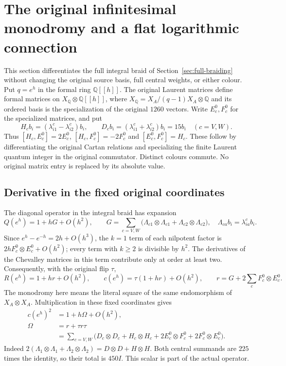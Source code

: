 \section{The original infinitesimal monodromy and a flat logarithmic connection}
\label{sec:infinitesimal-braid}
This section differentiates the full integral braid of
Section~\ref{sec:full-braiding} without changing the original source
basis, full central weights, or either colour. Put $q=e^h$ in the
formal ring $\mathbb Q[[h]]$. The original Laurent matrices define
formal matrices on $X_{\mathbb Q}\otimes\mathbb Q[[h]]$, where
$X_{\mathbb Q}=X_A/(q-1)X_A\otimes\mathbb Q$ and its ordered basis
is the specialization of the original $1260$ vectors. Write
$E_c^0,F_c^0$ for the specialized matrices, and put
\[
 H_c b_i=(\lambda^c_{i1}-\lambda^c_{i2})b_i,\qquad
 D_c b_i=(\lambda^c_{i1}+\lambda^c_{i2})b_i=15b_i
 \quad(c=V,W).
\]
Thus $[H_c,E_c^0]=2E_c^0$, $[H_c,F_c^0]=-2F_c^0$ and
$[E_c^0,F_c^0]=H_c$. These follow by differentiating the original
Cartan relations and specializing the finite Laurent quantum integer
in the original commutator. Distinct colours commute. No original
matrix entry is replaced by its absolute value.

\subsection{Derivative in the fixed original coordinates}
The diagonal operator in the integral braid has expansion
\[
 Q(e^h)=1+hG+O(h^2),\qquad
 G=\sum_{c=V,W}\bigl(\Lambda_{c1}\otimes\Lambda_{c1}
                       +\Lambda_{c2}\otimes\Lambda_{c2}\bigr),
 \quad \Lambda_{ca}b_i=\lambda^c_{ia}b_i.
\]
Since $e^h-e^{-h}=2h+O(h^3)$, the $k=1$ term of each nilpotent
factor is $2hF_c^0\otimes E_c^0+O(h^2)$; every term with $k\ge2$
is divisible by $h^2$. The derivatives of the Chevalley matrices
in this term contribute only at order at least two. Consequently,
with the original flip $\tau$,
\begin{equation}
 R(e^h)=1+hr+O(h^2),\qquad c(e^h)=\tau(1+hr)+O(h^2),\qquad
 r=G+2\sum_c F_c^0\otimes E_c^0.
 \label{eq:ib-r}
\end{equation}
The monodromy here means the literal square of the same endomorphism
of $X_A\otimes X_A$. Multiplication in these fixed coordinates gives
\begin{align}
 c(e^h)^2&=1+h\Omega+O(h^2),\label{eq:ib-monodromy}\\
 \Omega&=r+\tau r\tau\nonumber\\
 &=\sum_{c=V,W}\bigl(D_c\otimes D_c+H_c\otimes H_c
       +2E_c^0\otimes F_c^0+2F_c^0\otimes E_c^0\bigr).
 \label{eq:ib-omega}
\end{align}
Indeed $2(\Lambda_1\otimes\Lambda_1+
\Lambda_2\otimes\Lambda_2)=D\otimes D+H\otimes H$.
Both central summands are $225$ times the identity, so their total
is $450I$. This scalar is part of the actual operator.

